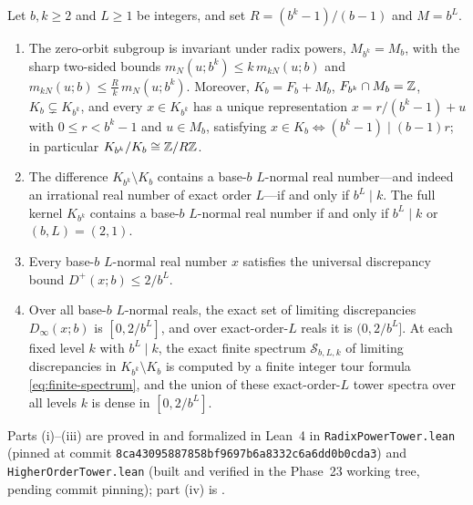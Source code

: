 \documentclass[11pt]{article}
\newcommand{\ttt}[1]{\texttt{#1}}
\newcommand{\phaseXXIIcommit}{8ca43095887858bf9697b6a8332c6a6dd0b0cda3}
\begin{document}
\begin{maintheorem}\label{thm:A}
Let $b,k\ge2$ and $L\ge1$ be integers, and set $R=(b^k-1)/(b-1)$ and $M=b^L$.
\begin{enumerate}[label=\textup{(\roman*)},nosep]
\item {} The zero-orbit subgroup is invariant under radix powers, $M_{b^k}=M_b$, with the sharp two-sided bounds $m_N(u;b^k)\le k\,m_{kN}(u;b)$ and $m_{kN}(u;b)\le\frac{R}{k}\,m_N(u;b^k)$. Moreover, $K_b=F_b+M_b$, $F_{b^k}\cap M_b=\mathbb Z$, $K_b\subsetneq K_{b^k}$, and every $x\in K_{b^k}$ has a unique representation $x=r/(b^k-1)+u$ with $0\le r<b^k-1$ and $u\in M_b$, satisfying $x\in K_b\iff(b^k-1)\mid(b-1)r$; in particular $K_{b^k}/K_b\cong\mathbb Z/R\mathbb Z$.
\item {} The difference $K_{b^k}\setminus K_b$ contains a base-$b$ $L$-normal real number---and indeed an irrational real number of exact order $L$---if and only if $b^L\mid k$. The full kernel $K_{b^k}$ contains a base-$b$ $L$-normal real number if and only if $b^L\mid k$ or $(b,L)=(2,1)$.
\item {} Every base-$b$ $L$-normal real number $x$ satisfies the universal discrepancy bound $D^+(x;b)\le 2/b^L$.
\item {} Over all base-$b$ $L$-normal reals, the exact set of limiting discrepancies $D_\infty(x;b)$ is $[0,2/b^L]$, and over exact-order-$L$ reals it is $(0,2/b^L]$. At each fixed level $k$ with $b^L\mid k$, the exact finite spectrum $\mathcal S_{b,L,k}$ of limiting discrepancies in $K_{b^k}\setminus K_b$ is computed by a finite integer tour formula \eqref{eq:finite-spectrum}, and the union of these exact-order-$L$ tower spectra over all levels $k$ is dense in $[0,2/b^L]$.
\end{enumerate}
\end{maintheorem}

Parts (i)--(iii) are proved in  and formalized in Lean~4 in \ttt{RadixPowerTower.lean} (pinned at commit \ttt{\phaseXXIIcommit}) and \ttt{HigherOrderTower.lean} (built and verified in the Phase~23 working tree, pending commit pinning); part (iv) is .
\end{document}
